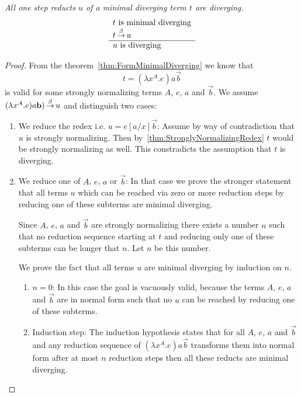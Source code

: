 \begin{theorem}
    \emph{All one step reducts $u$ of a minimal diverging term $t$ are
    diverging.}
    $$
    \begin{array}{l} 
        t \text{ is minimal diverging}
        \\
        t {\,\stackrel{\beta}{\to}\,} u
     \\ \hline 
        u \text{ is diverging}
    \end{array}
    $$

    \begin{proof}
        From the theorem~\ref{thm:FormMinimalDiverging} we know that
        $$
        t = (\lambda x^A.e) a \vec b
        $$
        is valid for some strongly normalizing terms $A$, $e$, $a$ and $\vec b$.
        We assume $(\lambda x^A.e) a {\mathbf b}) {\,\stackrel{\beta}{\to}\,} u$ and distinguish two
        cases:
        \begin{enumerate}
            \item We reduce the redex i.e. $u = e[a/x] \vec b$: Assume by way of
                contradiction that $u$ is strongly normalizing. Then
                by~\ref{thm:StronglyNormalizingRedex} $t$ would be strongly
                normalizing as well. This constradicts the assumption that $t$
                is diverging.

            \item We reduce one of $A$, $e$, $a$ or $\vec b$: In that case we
                prove the stronger statement that all terms $u$ which can be
                reached via zero or more reduction steps by reducing one of
                these subterms are minimal diverging.

                Since $A$, $e$, $a$ and $\vec b$ are strongly normalizing there
                exists a number $n$ such that no reduction sequence starting at
                $t$ and reducing only one of these subterms can be longer that
                $n$. Let $n$ be this number.

                We prove the fact that all terms $u$ are minimal diverging by
                induction on $n$.
                \begin{enumerate}
                    \item $n=0$: In this case the goal is vacuously valid,
                        because the terms $A$, $e$, $a$ and $\vec b$ are in
                        normal form such that no $u$ can be reached by reducing
                        one of these subterms.

                    \item Induction step: The induction hypothesis states that
                        for all $A$, $e$, $a$ and $\vec b$ and any reduction
                        sequence of $(\lambda x^A. e) a \vec b$ transforms them
                        into normal form after at most $n$ reduction steps then
                        all these reducts are minimal diverging.


\end{enumerate}
\end{enumerate}
\end{proof}
\end{theorem}
